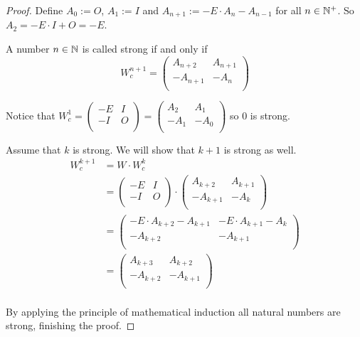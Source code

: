 \begin{proof}
  Define $A_{0} := O$, $A_{1} := I$ and
  $A_{n+1} := -E \cdot A_{n} - A_{n-1}$ for all $n\in\mathbb{N}^{+}$. So
  $A_{2} = -E \cdot I + O = -E$.

  A number $n\in\mathbb{N}$ is called strong if and only if
  \[
  W_{c}^{n+1}
  =
  \left(
  \begin{array}{cc}
     A_{n+2} &  A_{n+1} \\
    -A_{n+1} & -A_{n}   \\
  \end{array}
  \right)
  \]

  Notice that
  $W_{c}^{1} = \left(\begin{smallmatrix} -E & I \\ -I & O \\\end{smallmatrix}\right) = \left(\begin{smallmatrix} A_{2} & A_{1} \\ -A_{1} & -A_{0} \\\end{smallmatrix}\right)$
  so $0$ is strong.

  Assume that $k$ is strong. We will show that $k+1$ is strong as well.
  \[
  \begin{aligned}
  W_{c}^{k+1}
  & = W \cdot W_{c}^{k} \\
  & =
  \left(
  \begin{array}{cc}
    -E & I \\
    -I & O \\
  \end{array}
  \right)
  \cdot
  \left(
  \begin{array}{cc}
     A_{k+2} &  A_{k+1} \\
    -A_{k+1} & -A_{k}   \\
  \end{array}
  \right) \\
  & =
  \left(
  \begin{array}{cc}
    -E \cdot A_{k+2} - A_{k+1} & -E \cdot A_{k+1} - A_{k} \\
    -A_{k+2}                  & -A_{k+1}                 \\
  \end{array}
  \right) \\
  & =
  \left(
  \begin{array}{cc}
     A_{k+3} &  A_{k+2} \\
    -A_{k+2} & -A_{k+1} \\
  \end{array}
  \right) \\
  \end{aligned}
  \]

  By applying the principle of mathematical induction all natural
  numbers are strong, finishing the proof.
\end{proof}


